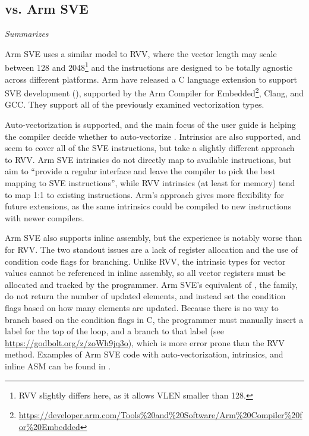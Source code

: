 \documentclass[../thesis]{subfiles}
\begin{document}
\subsection{vs. Arm SVE}\label{chap:soft:compiling:armsve}
\emph{Summarizes \cite{armltdArmCompilerScalable2019}}

Arm SVE uses a similar model to RVV, where the vector length may scale between 128 and 2048\footnote{RVV slightly differs here, as it allows VLEN smaller than 128.} and the instructions are designed to be totally agnostic across different platforms\cite{stephensARMScalableVector2017}.
Arm have released a C language extension to support SVE development (\cite{armltdARMLanguageExtensions2020}), supported by the Arm Compiler for Embedded\footnote{\url{https://developer.arm.com/Tools\%20and\%20Software/Arm\%20Compiler\%20for\%20Embedded}}, Clang, and GCC.
They support all of the previously examined vectorization types.

Auto-vectorization is supported, and the main focus of the user guide is helping the compiler decide whether to auto-vectorize \cite{armltdArmCompilerScalable2019}.
Intrinsics are also supported, and seem to cover all of the SVE instructions, but take a slightly different approach to RVV.
Arm SVE intrinsics do not directly map to available instructions, but aim to \enquote{provide a regular interface and leave the compiler to pick the best mapping to SVE instructions}, while RVV intrinsics (at least for memory) tend to map 1:1 to existing instructions.
Arm's approach gives more flexibility for future extensions, as the same intrinsics could be compiled to new instructions with newer compilers.

Arm SVE also supports inline assembly, but the experience is notably worse than for RVV.
The two standout issues are a lack of register allocation and the use of condition code flags for branching.
Unlike RVV, the intrinsic types for vector values cannot be referenced in inline assembly\cite{stephensARMScalableVector2017}, so all vector registers must be allocated and tracked by the programmer.
Arm SVE's equivalent of , the  family\cite{armltdARMLanguageExtensions2020}, do not return the number of updated elements, and instead set the condition flags based on how many elements are updated.
Because there is no way to branch based on the condition flags in C, the programmer must manually insert a label for the top of the loop, and a branch to that label (see \url{https://godbolt.org/z/zoWh9jq3o}), which is more error prone than the RVV method.
Examples of Arm SVE code with auto-vectorization, intrinsics, and inline ASM can be found in .
\end{document}
